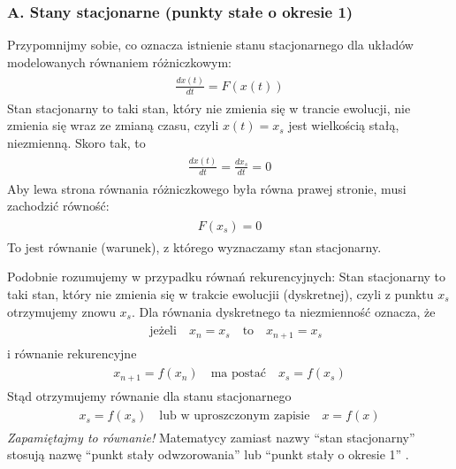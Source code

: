 \documentclass[a4paper,12pt,polish]{sphinxmanual}
\begin{document}
\subsubsection{A. Stany stacjonarne (punkty stałe o okresie 1)}
\label{ch1/chI031:a-stany-stacjonarne-punkty-stale-o-okresie-1}
Przypomnijmy sobie, co oznacza istnienie stanu stacjonarnego dla układów modelowanych równaniem różniczkowym:
\label{ch1/chI031:equation-eqn6}\begin{gather}
\begin{split} \frac{dx(t)}{dt} = F(x(t))\end{split}\label{ch1/chI031-eqn6}
\end{gather}
Stan stacjonarny to taki stan, który nie zmienia się w trancie ewolucji, nie zmienia się wraz ze zmianą czasu, czyli $x(t) = x_s$ jest wielkością stałą, niezmienną. Skoro tak, to
\label{ch1/chI031:equation-eqn7}\begin{gather}
\begin{split} \frac{dx(t)}{dt}  = \frac{dx_s}{dt}  = 0\end{split}\label{ch1/chI031-eqn7}
\end{gather}
Aby lewa strona równania różniczkowego była równa prawej stronie, musi zachodzić równość:
\label{ch1/chI031:equation-eqn8}\begin{gather}
\begin{split}F(x_s) = 0\end{split}\label{ch1/chI031-eqn8}
\end{gather}
To jest równanie (warunek), z którego wyznaczamy stan stacjonarny.

Podobnie rozumujemy w przypadku równań rekurencyjnych:  Stan stacjonarny to taki stan, który nie zmienia się w trakcie ewolucjii (dyskretnej), czyli z punktu $x_s$ otrzymujemy znowu $x_s$. Dla równania dyskretnego ta niezmienność oznacza, że
\label{ch1/chI031:equation-eqn9}\begin{gather}
\begin{split}\quad \mbox{jeżeli} \quad x_n = x_s \quad \mbox{to} \quad x_{n+1} = x_s\end{split}\label{ch1/chI031-eqn9}
\end{gather}
i równanie rekurencyjne
\label{ch1/chI031:equation-eqn10}\begin{gather}
\begin{split}x_{n+1} = f(x_n) \quad \mbox{ma postać} \quad x_s = f(x_s)\end{split}\label{ch1/chI031-eqn10}
\end{gather}
Stąd otrzymujemy równanie dla stanu stacjonarnego
\label{ch1/chI031:equation-eqn11}\begin{gather}
\begin{split}x_s = f(x_s) \quad \mbox{lub w uproszczonym zapisie} \quad x=f(x)\end{split}\label{ch1/chI031-eqn11}
\end{gather}
\emph{Zapamiętajmy to równanie!} Matematycy zamiast nazwy ``stan stacjonarny'' stosują nazwę ``punkt stały odwzorowania'' lub ``punkt stały o okresie 1'' .
\end{document}
